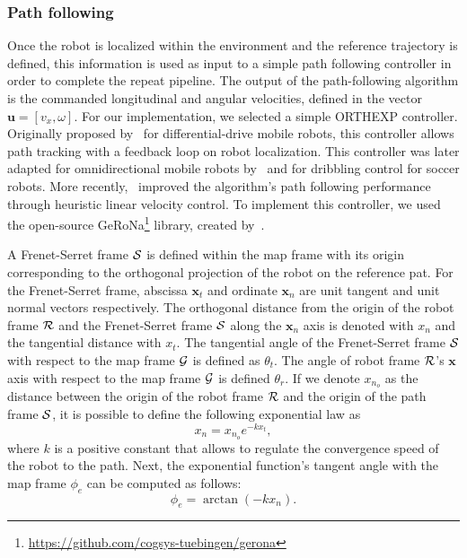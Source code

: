 \subsubsection{Path following}
\label{sec:orthexp}


Once the robot is localized within the environment and the reference trajectory is defined, this information is used as input to a simple path following controller in order to complete the repeat pipeline.
The output of the path-following algorithm is the commanded longitudinal and angular velocities, defined in the vector $\bm u = [v_x, \omega]$.
For our implementation, we selected a simple \ac{ORTHEXP} controller.
Originally proposed by~\citet{Mojaev2004} for differential-drive mobile robots, this controller allows path tracking with a feedback loop on robot localization.
This controller was later adapted for omnidirectional mobile robots by~\citet{Li2007} and for dribbling control for soccer robots.
More recently,~\citet{Huskic2017} improved the algorithm's path following performance through heuristic linear velocity control.
To implement this controller, we used the open-source \ac{GeRoNa}\footnote{\url{https://github.com/cogsys-tuebingen/gerona}} library, created by~\citet{Huskic2019}.

A Frenet-Serret frame $\mathcal{S}$ is defined within the map frame with its origin corresponding to the orthogonal projection of the robot on the reference pat.
For the Frenet-Serret frame, abscissa $\bm x_t$ and ordinate $\bm x_n$ are unit tangent and unit normal vectors respectively.
The orthogonal distance from the origin of the robot frame $\mathcal{R}$ and the Frenet-Serret frame $\mathcal{S}$ along the $\bm x_n$ axis is denoted with $x_n$ and the tangential distance with $x_t$.
The tangential angle of the Frenet-Serret frame $\mathcal{S}$ with respect to the map frame $\mathcal{G}$ is defined as $\theta_t$.
The angle of robot frame $\mathcal{R}$'s $\bm x$ axis with respect to the map frame $\mathcal{G}$ is defined $\theta_r$. %
If we denote $x_{n_o}$ as the distance between the origin of the robot frame $\mathcal{R}$ and the origin of the path frame $\mathcal{S}$, it is possible to define the following exponential law as
\begin{equation}
	\label{eq:exp_law}
	x_n = x_{n_o} e^{-k x_t},
\end{equation}
where $k$ is a positive constant that allows to regulate the convergence speed of the robot to the path.
Next, the exponential function's tangent angle with the map frame $\phi_e$ can be computed as follows:
\begin{equation}
	\label{eq:exp_angle}
	\phi_e = \arctan(-k x_n).
\end{equation}

